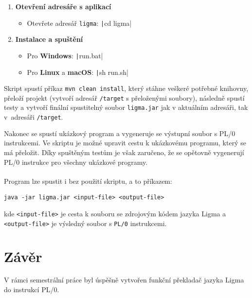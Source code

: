 \documentclass[czech, oth, kiv, he, iso690numb, viewonly]{fasthesis}
\begin{document}
    \begin{enumerate}
        \item \textbf{Otevření adresáře s aplikací}
            \begin{itemize}
                \item Otevřete adresář \texttt{ligma}: \texttt|cd ligma|
            \end{itemize}
        \item \textbf{Instalace a spuštění}
            \begin{itemize}
                \item Pro \textbf{Windows}: \texttt|run.bat|
                \item Pro \textbf{Linux} a \textbf{macOS}: \texttt|sh run.sh|
            \end{itemize}
    \end{enumerate}
    Skript spustí příkaz \texttt{mvn clean install}, který stáhne veškeré potřebné knihovny, přeloží projekt (vytvoří adresář \texttt{/target} s přeloženými soubory), následně spustí testy a vytvoří finální spustitelný soubor \texttt{ligma.jar} jak v aktuálním adresáři, tak v~adresáři \texttt{/target}. 
    
    Nakonec se spustí ukázkový program a vygeneruje se výstupní soubor s PL/0 instrukcemi.
    Ve skriptu je možné upravit cestu k ukázkovému programu, který se má přeložit. Díky spuštěným testům je však zaručeno, že se opětovně vygenerují PL/0 instrukce pro všechny ukázkové programy.
    \\\\
    Program lze spustit i bez použití skriptu, a to příkazem:
    \begin{verbatim}
java -jar ligma.jar <input-file> <output-file>
    \end{verbatim}
    kde \texttt{<input-file>} je cesta k souboru se zdrojovým kódem jazyka Ligma a \texttt{<output-file>} je výsledný soubor s \texttt{PL/0} instrukcemi.

    \chapter{Závěr}

    V rámci semestrální práce byl úspěšně vytvořen funkční překladač jazyka Ligma do instrukcí PL/0.
    
\end{document}
